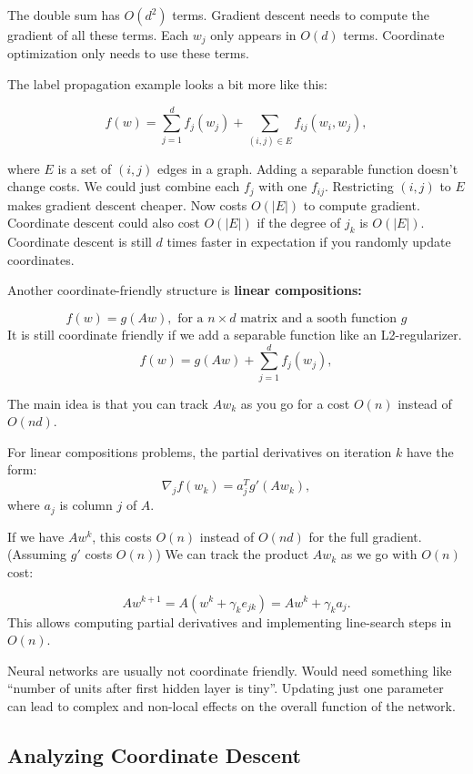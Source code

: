 \documentclass[
]{article}
\begin{document}
The double sum has \(O(d^2)\) terms. Gradient descent needs to compute the gradient of all these terms.
Each \(w_j\) only appears in \(O(d)\) terms. Coordinate optimization only needs to use these terms.

The label propagation example looks a bit more like this:

\[
f(w) = \sum_{j=1}^{d} f_j(w_j) + \sum_{(i,j) \in E} f_{ij}(w_i, w_j),
\]

where \(E\) is a set of \((i, j)\) edges in a graph. Adding a separable function doesn't change costs. We could just combine each \(f_j\) with one \(f_{ij}\). Restricting \((i, j)\) to \(E\) makes gradient descent cheaper. Now costs \(O(|E|)\) to compute gradient. Coordinate descent could also cost \(O(|E|)\) if the degree of \(j_k\) is \(O(|E|)\). Coordinate descent is still \(d\) times faster in expectation if you randomly update coordinates.

Another coordinate-friendly structure is \textbf{linear compositions:}

\[
f(w) = g(Aw), \text{ for a } n \times d \text{ matrix and a sooth function } g
\]
It is still coordinate friendly if we add a separable function like an L2-regularizer.
\[
f(w) = g(Aw) + \sum_{j=1}^{d} f_j(w_j),
\]

The main idea is that you can track \(Aw_k\) as you go for a cost \(O(n)\) instead of \(O(nd)\).

For linear compositions problems, the partial derivatives on iteration \(k\) have the form:
\[
\nabla_j f(w_k) = a_j^T g'(Aw_k),
\]
where \(a_j\) is column \(j\) of \(A\).

If we have \(Aw^k\), this costs \(O(n)\) instead of \(O(nd)\) for the full gradient. (Assuming \(g'\) costs \(O(n)\))
We can track the product \(Aw_k\) as we go with \(O(n)\) cost:

\[
Aw^{k+1} = A(w^k + \gamma_k e_{jk}) = Aw^k + \gamma_k a_j.
\]
This allows computing partial derivatives and implementing line-search steps in \(O(n)\).

Neural networks are usually not coordinate friendly. Would need something like ``number of units after first hidden layer is tiny''. Updating just one parameter can lead to complex and non-local effects on the overall function of the network.

\subsection{Analyzing Coordinate Descent}\label{analyzing-coordinate-descent}
\end{document}
